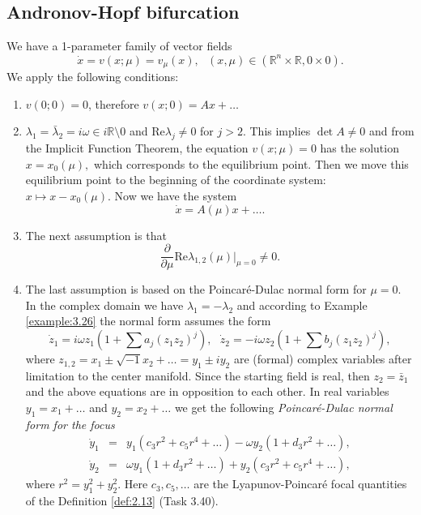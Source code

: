 \subsection{Andronov-Hopf bifurcation}
We have a 1-parameter family of vector fields
$$
\dot{x}=v(x;\mu )=v_{\mu }(x),\text{ \ \ }\left( x,\mu \right) \in \left(
\mathbb{R}^{n}\times \mathbb{R},0\times 0\right) .
$$
We apply the following conditions:
\begin{enumerate}
	\item $v(0;0)=0$, therefore $v(x;0)=Ax+\ldots $
	\item $\lambda _{1}=\bar{\lambda}_{2}=i\omega \in i\mathbb{R}\setminus 0$
	and $\textrm{Re}\lambda _{j}\not=0$ for $j>2.$ This implies $\det A\not=0$ and from the Implicit Function Theorem, the equation $v(x;\mu )=0$ has the solution $x=x_{0}(\mu ),$ which corresponds to the equilibrium point. Then we move this equilibrium point to the beginning of the coordinate system:
	$x\longmapsto x-x_{0}(\mu ).$ Now we have the system
	$$
	\dot{x}=A(\mu )x+\ldots .
	$$
	\item The next assumption is that
	$$
	\frac{\partial }{\partial \mu }\textrm{Re}\lambda _{1,2}(\mu )|_{\mu =0}\not=0.
	$$	
	\item The last assumption is based on the Poincaré-Dulac normal form for $\mu = 0$. In the complex domain we have $\lambda_{1}=-\lambda _{2}$ and according to Example \ref{example:3.26} the normal form assumes the form
	$$
	\dot{z}_{1}=i\omega z_{1}\left( 1+\sum a_{j}\left( z_{1}z_{2}\right)
	^{j}\right) ,\text{ \ \ }\dot{z}_{2}=-i\omega z_{2}\left( 1+\sum b_{j}\left(
	z_{1}z_{2}\right) ^{j}\right) ,
	$$
	where $z_{1,2}=x_{1}\pm \sqrt{-1}x_{2}+\ldots =y_{1}\pm iy_{2}$ are (formal) complex variables after limitation to the center manifold. Since the starting field is real, then $z_{2}=\bar{z}_{1}$ and the above equations are in opposition to each other. In real variables $y_{1}=x_{1}+\ldots $ and $y_{2}=x_{2}+\ldots $ we get the following \emph{Poincaré-Dulac normal form for the focus}
	\begin{eqnarray*}
		\dot{y}_{1} &=&y_{1}\left( c_{3}r^{2}+c_{5}r^{4}+\ldots \right) -\omega
		y_{2}\left( 1+d_{3}r^{2}+\ldots \right) , \\
		\dot{y}_{2} &=&\omega y_{1}\left( 1+d_{3}r^{2}+\ldots \right) +y_{2}\left(
		c_{3}r^{2}+c_{5}r^{4}+\ldots \right) ,
	\end{eqnarray*}
	where $r^{2}=y_{1}^{2}+y_{2}^{2}.$ Here $c_{3},c_{5},\ldots $ are the Lyapunov-Poincaré focal quantities of the Definition \ref{def:2.13} (Task 3.40).
\end{enumerate}

